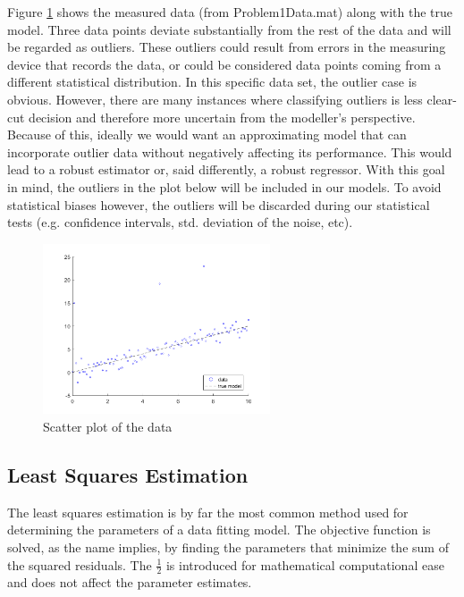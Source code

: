 Figure \ref{fig:dataPlot} shows the measured data (from Problem1Data.mat) along with the true model. Three data points deviate substantially from the rest of the data and will be regarded as outliers. These outliers could result from errors in the measuring device that records the data, or could be considered data points coming from a different statistical distribution. In this specific data set, the outlier case is obvious. However, there are many instances where classifying outliers is less clear-cut decision and therefore more uncertain from the modeller's perspective. Because of this, ideally we would want an approximating model that can incorporate outlier data without negatively affecting its performance. This would lead to a robust estimator or, said differently, a robust regressor. With this goal in mind, the outliers in the plot below will be included in our models. To avoid statistical biases however, the outliers will be discarded during our statistical tests (e.g. confidence intervals, std. deviation of the noise, etc). 

\vspace*{\fill} 
\begin{figure}[htb]
\centering
\includegraphics[width=0.6\textwidth]{../img/data_plot}
\caption{Scatter plot of the data}
\label{fig:dataPlot}
\end{figure}
\vspace*{\fill} 

\subsection{Least Squares Estimation}

The least squares estimation is by far the most common method used for determining the parameters of a data fitting model. The objective function is solved, as the name implies, by finding the parameters that minimize the sum of the squared residuals. The $\frac{1}{2}$ is introduced for mathematical computational ease and does not affect the parameter estimates.


